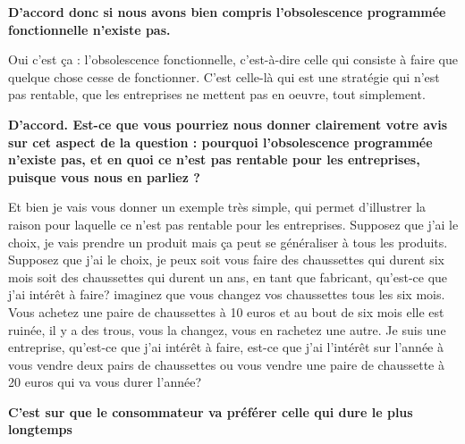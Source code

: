 \begin{small}
\textbf{D'accord donc si nous avons bien compris l'obsolescence programmée fonctionnelle n'existe pas.
}\smallbreak

Oui c'est ça : l'obsolescence  fonctionnelle, c'est-à-dire celle qui consiste à faire que quelque chose cesse de fonctionner. C'est celle-là qui est une stratégie qui n'est pas rentable, que les entreprises ne mettent pas en oeuvre, tout simplement.

\smallbreak\textbf{D'accord. Est-ce que vous pourriez nous donner clairement votre avis sur cet aspect de la question : pourquoi l'obsolescence programmée  n'existe pas, et en quoi ce n'est pas rentable pour les entreprises, puisque vous nous en parliez ?
}\smallbreak

Et bien je vais vous donner un exemple très simple, qui permet d'illustrer la raison pour laquelle ce n'est pas rentable pour les entreprises. Supposez que j'ai le choix, je vais prendre un produit mais ça peut se généraliser à tous les produits. Supposez que j'ai le choix, je peux soit vous faire des chaussettes qui durent six mois soit des chaussettes qui durent un ans, en tant que fabricant, qu'est-ce que j'ai intérêt à faire? imaginez que vous changez vos chaussettes tous les six mois. Vous achetez une paire de chaussettes à 10 euros et au bout de six mois elle est ruinée, il y a des trous, vous la changez, vous en rachetez une autre. Je suis une entreprise, qu'est-ce que j'ai intérêt à faire, est-ce que j'ai l'intérêt sur l'année à vous vendre deux pairs de chaussettes ou vous vendre une paire de chaussette à 20 euros qui va vous durer l'année?

\smallbreak\textbf{C'est sur que le consommateur va préférer celle qui dure le plus longtemps
}\smallbreak


\end{small}
